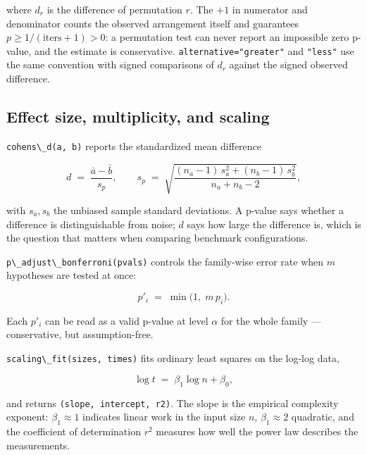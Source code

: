 \documentclass[
  10pt,
]{article}
\newcommand{\passthrough}[1]{#1}
\begin{document}
where \(d_r\) is the difference of permutation \(r\). The \(+1\) in
numerator and denominator counts the observed arrangement itself and
guarantees \(p \ge 1/(\text{iters}+1) > 0\): a permutation test can
never report an impossible zero p-value, and the estimate is
conservative. \passthrough{\lstinline!alternative="greater"!} and
\passthrough{\lstinline!"less"!} use the same convention with signed
comparisons of \(d_r\) against the signed observed difference.

\subsection{Effect size, multiplicity, and
scaling}\label{effect-size-multiplicity-and-scaling}

\passthrough{\lstinline!cohens\_d(a, b)!} reports the standardized mean
difference

\begin{equation}
\label{eq:stat-cohens}
d \;=\; \frac{\bar{a} - \bar{b}}{s_p},
\qquad
s_p \;=\;
\sqrt{\frac{(n_a - 1)\,s_a^2 + (n_b - 1)\,s_b^2}{n_a + n_b - 2}},
\end{equation}

with \(s_a, s_b\) the unbiased sample standard deviations. A p-value
says whether a difference is distinguishable from noise; \(d\) says how
large the difference is, which is the question that matters when
comparing benchmark configurations.

\passthrough{\lstinline!p\_adjust\_bonferroni(pvals)!} controls the
family-wise error rate when \(m\) hypotheses are tested at once:

\begin{equation}
\label{eq:stat-bonferroni}
p'_i \;=\; \min\!\big(1,\; m\, p_i\big).
\end{equation}

Each \(p'_i\) can be read as a valid p-value at level \(\alpha\) for the
whole family --- conservative, but assumption-free.

\passthrough{\lstinline!scaling\_fit(sizes, times)!} fits ordinary least
squares on the log-log data,

\begin{equation}
\label{eq:stat-scaling}
\log t \;=\; \beta_1 \log n + \beta_0,
\end{equation}

and returns \passthrough{\lstinline!(slope, intercept, r2)!}. The slope
is the empirical complexity exponent: \(\beta_1 \approx 1\) indicates
linear work in the input size \(n\), \(\beta_1 \approx 2\) quadratic,
and the coefficient of determination \(r^2\) measures how well the power
law describes the measurements.
\end{document}
